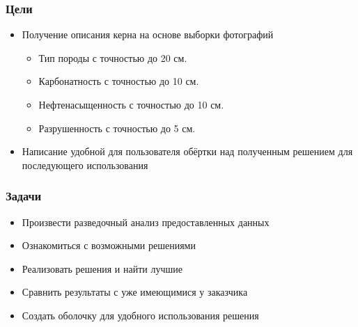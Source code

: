 \documentclass[xetex,mathserif,serif]{beamer}
\begin{document}
	
	\begin{frame}
		\frametitle{Цели}
		
		\begin{itemize}
	    	\item Получение описания керна на основе выборки фотографий
    		\begin{itemize}
                \item Тип породы с точностью до 20 см. 
                \item Карбонатность с точностью до 10 см.
                \item Нефтенасыщенность с точностью до 10 см.
                \item Разрушенность с точностью до 5 см.
            \end{itemize}
            \item Написание удобной для пользователя обёртки над полученным решением для последующего использования   	
        \end{itemize} 
        
	\end{frame}		
	
	
	\begin{frame}
		\frametitle{Задачи}
		
        \begin{itemize}
            \item Произвести разведочный анализ предоставленных данных
            \item Ознакомиться с возможными решениями
            \item Реализовать решения и найти лучшие
            \item Сравнить результаты с уже имеющимися у заказчика
            \item Создать оболочку для удобного использования решения
        \end{itemize} 
        
	\end{frame}		
	
\end{document}
